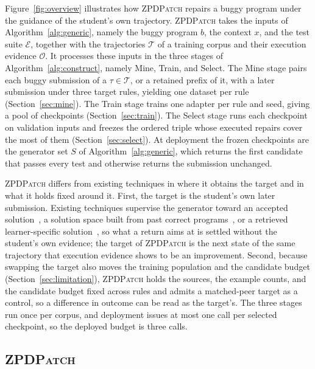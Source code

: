 \documentclass[10pt,conference]{IEEEtran}
\begin{document}
Figure~\ref{fig:overview} illustrates how \textsc{ZPDPatch} repairs a buggy program under the guidance of the student's own trajectory. \textsc{ZPDPatch} takes the inputs of Algorithm~\ref{alg:generic}, namely the buggy program \(b\), the context \(x\), and the test suite \(\mathcal E\), together with the trajectories \(\mathcal T\) of a training corpus and their execution evidence \(\mathcal O\). It processes these inputs in the three stages of Algorithm~\ref{alg:construct}, namely Mine, Train, and Select. The Mine stage pairs each buggy submission of a \(\tau\in\mathcal T\), or a retained prefix of it, with a later submission under three target rules, yielding one dataset per rule (Section~\ref{sec:mine}). The Train stage trains one adapter per rule and seed, giving a pool of checkpoints (Section~\ref{sec:train}). The Select stage runs each checkpoint on validation inputs and freezes the ordered triple whose executed repairs cover the most of them (Section~\ref{sec:select}). At deployment the frozen checkpoints are the generator set \(S\) of Algorithm~\ref{alg:generic}, which returns the first candidate that passes every test and otherwise returns the submission unchanged.

\textsc{ZPDPatch} differs from existing techniques in where it obtains the target and in what it holds fixed around it. First, the target is the student's own later submission. Existing techniques supervise the generator toward an accepted solution~\cite{gulwani2018automated,wang2018search,hu2019re}, a solution space built from past correct programs~\cite{piech2015embeddings,rivers2017data,price2017isnap}, or a retrieved learner-specific solution~\cite{dai2026learner}, so what a return aims at is settled without the student's own evidence; the target of \textsc{ZPDPatch} is the next state of the same trajectory that execution evidence shows to be an improvement. Second, because swapping the target also moves the training population and the candidate budget (Section~\ref{sec:limitation}), \textsc{ZPDPatch} holds the sources, the example counts, and the candidate budget fixed across rules and admits a matched-peer target as a control, so a difference in outcome can be read as the target's. The three stages run once per corpus, and deployment issues at most one call per selected checkpoint, so the deployed budget is three calls.

\subsection{\textup{\textsc{ZPDPatch}}}
\end{document}
